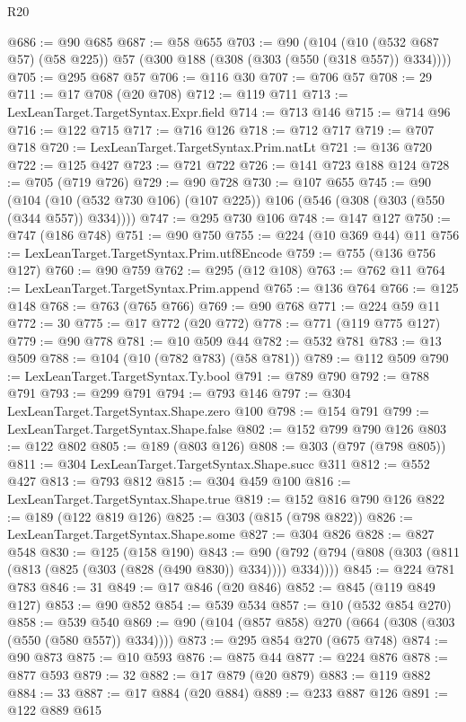 \begin{lexlean}{R20}
\begin{coremodule}
@686 := @90 @685
@687 := @58 @655
@703 := @90
    (@104 (@10 (@532 @687 @57) (@58 @225)) @57 (@300 @188 (@308 (@303 (@550 (@318 @557)) @334))))
@705 := @295 @687 @57
@706 := @116 @30
@707 := @706 @57
@708 := 29
@711 := @17 @708 (@20 @708)
@712 := @119 @711
@713 := LexLeanTarget.TargetSyntax.Expr.field
@714 := @713 @146
@715 := @714 @96
@716 := @122 @715
@717 := @716 @126
@718 := @712 @717
@719 := @707 @718
@720 := LexLeanTarget.TargetSyntax.Prim.natLt
@721 := @136 @720
@722 := @125 @427
@723 := @721 @722
@726 := @141 @723 @188 @124
@728 := @705 (@719 @726)
@729 := @90 @728
@730 := @107 @655
@745 := @90
    (@104 (@10 (@532 @730 @106) (@107 @225)) @106 (@546 (@308 (@303 (@550 (@344 @557)) @334))))
@747 := @295 @730 @106
@748 := @147 @127
@750 := @747 (@186 @748)
@751 := @90 @750
@755 := @224 (@10 @369 @44) @11
@756 := LexLeanTarget.TargetSyntax.Prim.utf8Encode
@759 := @755 (@136 @756 @127)
@760 := @90 @759
@762 := @295 (@12 @108)
@763 := @762 @11
@764 := LexLeanTarget.TargetSyntax.Prim.append
@765 := @136 @764
@766 := @125 @148
@768 := @763 (@765 @766)
@769 := @90 @768
@771 := @224 @59 @11
@772 := 30
@775 := @17 @772 (@20 @772)
@778 := @771 (@119 @775 @127)
@779 := @90 @778
@781 := @10 @509 @44
@782 := @532 @781
@783 := @13 @509
@788 := @104 (@10 (@782 @783) (@58 @781))
@789 := @112 @509
@790 := LexLeanTarget.TargetSyntax.Ty.bool
@791 := @789 @790
@792 := @788 @791
@793 := @299 @791
@794 := @793 @146
@797 := @304 LexLeanTarget.TargetSyntax.Shape.zero @100
@798 := @154 @791
@799 := LexLeanTarget.TargetSyntax.Shape.false
@802 := @152 @799 @790 @126
@803 := @122 @802
@805 := @189 (@803 @126)
@808 := @303 (@797 (@798 @805))
@811 := @304 LexLeanTarget.TargetSyntax.Shape.succ @311
@812 := @552 @427
@813 := @793 @812
@815 := @304 @459 @100
@816 := LexLeanTarget.TargetSyntax.Shape.true
@819 := @152 @816 @790 @126
@822 := @189 (@122 @819 @126)
@825 := @303 (@815 (@798 @822))
@826 := LexLeanTarget.TargetSyntax.Shape.some
@827 := @304 @826
@828 := @827 @548
@830 := @125 (@158 @190)
@843 := @90 (@792 (@794 (@808 (@303 (@811 (@813 (@825 (@303 (@828 (@490 @830)) @334)))) @334))))
@845 := @224 @781 @783
@846 := 31
@849 := @17 @846 (@20 @846)
@852 := @845 (@119 @849 @127)
@853 := @90 @852
@854 := @539 @534
@857 := @10 (@532 @854 @270)
@858 := @539 @540
@869 := @90 (@104 (@857 @858) @270 (@664 (@308 (@303 (@550 (@580 @557)) @334))))
@873 := @295 @854 @270 (@675 @748)
@874 := @90 @873
@875 := @10 @593
@876 := @875 @44
@877 := @224 @876
@878 := @877 @593
@879 := 32
@882 := @17 @879 (@20 @879)
@883 := @119 @882
@884 := 33
@887 := @17 @884 (@20 @884)
@889 := @233 @887 @126
@891 := @122 @889 @615

\end{coremodule}
\end{lexlean}
